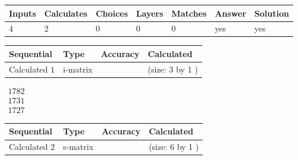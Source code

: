 \documentclass[12pt]{article}
\begin{document}
 
 
\noindent{}
 
 

 
 
 
\noindent{}
 
 

 
 
\noindent{}
 
 

 
\vspace{0.3in}
   
   
   
   
\noindent\begin{tabular}{|l|l|l|l|l|l|l|}
 \hline
Inputs & Calculates & Choices & Layers & Matches & Answer & Solution \\ \hline
           4  & 
           2  & 
           0
  & 
           0  & 
           0  & 
  yes & 
  yes 
  \\ \hline
 \end{tabular}
   
   
   
   
\noindent{}
   
   
  
  
\noindent\begin{tabular}{|l|l|l|l|}
\hline
 Sequential & Type & Accuracy & Calculated \\ 
\hline
 
 
  Calculated $            1 $ & i-matrix &  & 
 (size:            3  by            1 )
 \\  \hline  
 \end{tabular}
   
   
$\begin{array}{
 c
 }
        1782  \\ 
        1731  \\ 
        1727
 \end{array}  $ 
  
  
\noindent\begin{tabular}{|l|l|l|l|}
\hline
 Sequential & Type & Accuracy & Calculated \\ 
\hline
 
 
  Calculated $            2 $ & s-matrix & & 
 (size:            6  by            1 )
 \\  \hline  
 \end{tabular}
   
\end{document}
